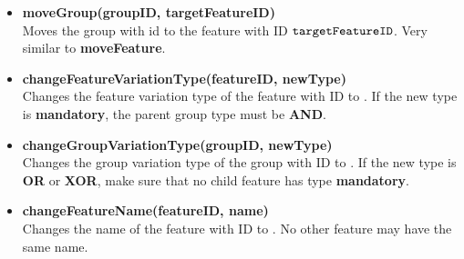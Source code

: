 \begin{itemize}
  \item \textbf{moveGroup(groupID, targetFeatureID)} \\
    Moves the group with id  to the feature with ID $\texttt{targetFeatureID}$. Very similar to \textbf{moveFeature}. 
  \item \textbf{changeFeatureVariationType(featureID, newType)} \\
    Changes the feature variation type of the feature with ID  to . If the new type is \textbf{mandatory}, the parent group type must be \textbf{AND}. 
  \item \textbf{changeGroupVariationType(groupID, newType)}\\
    Changes the group variation type of the group with ID  to . If the new type is \textbf{OR} or \textbf{XOR}, make sure that no child feature has type \textbf{mandatory}. 
  \item \textbf{changeFeatureName(featureID, name)}\\
    Changes the name of the feature with ID  to . No other feature may have the same name.
\end{itemize}

